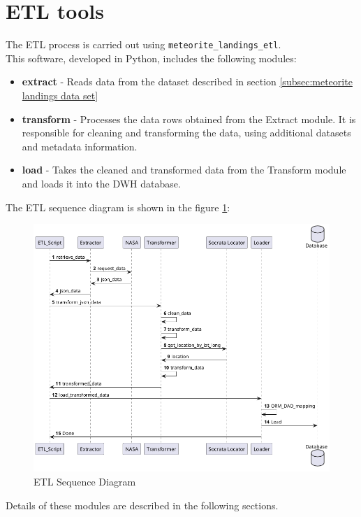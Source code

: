 \documentclass[conference]{IEEEtran}
\begin{document}
	\section{ETL tools}
	The ETL process is carried out using \texttt{meteorite\_landings\_etl}.\\ This software, developed in Python, includes the following modules:
	\begin{itemize}
		\item \textbf{extract} - Reads data from the dataset described in section \ref{subsec:meteorite landings data set}
		\item \textbf{transform} - Processes the data rows obtained from the Extract module. It is responsible for cleaning and transforming the data, using additional datasets and metadata information.
		\item \textbf{load} - Takes the cleaned and transformed data from the Transform module and loads it into the DWH database.
	\end{itemize}
	The ETL sequence diagram is shown in the figure \ref{fig:ETL Sequence Diagram}:
	\begin{figure}[htpb]
		\centering
		\includegraphics[width=\columnwidth]{images/sequence_diagram_etl.png}
		\caption{ETL Sequence Diagram}
		\label{fig:ETL Sequence Diagram}
	\end{figure}
	
	Details of these modules are described in the following sections.
\end{document}
